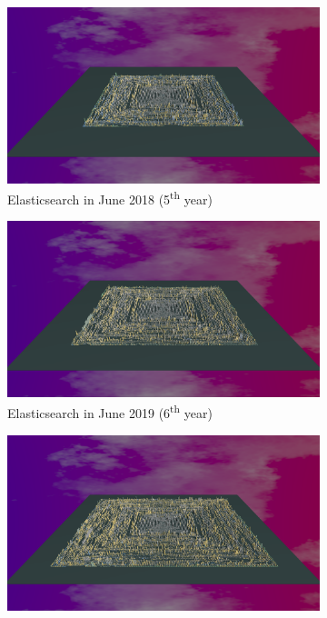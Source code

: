 \begin{figure}[ht]
    \begin{subfigure}{0.48\textwidth}
        \includegraphics[width=\linewidth]{Elasticsearch/Animation005.png}
        \caption{Elasticsearch in June 2018 (5\textsuperscript{th} year)} 
        \label{fig:Elastic_V5_S3}
    \end{subfigure}\hspace*{\fill}
    \begin{subfigure}{0.48\textwidth}
        \includegraphics[width=\linewidth]{Elasticsearch/Animation006.png}
        \caption{Elasticsearch in June 2019  (6\textsuperscript{th} year)} 
        \label{fig:Elastic_V5_S4}
    \end{subfigure}
    \medskip
    \begin{subfigure}{0.48\textwidth}
        \includegraphics[width=\linewidth]{Elasticsearch/Animation008.png}

\end{subfigure}
\end{figure}
